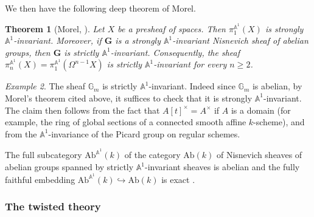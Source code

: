 \documentclass[11pt,leqno]{amsart}
\renewcommand{\1}{{\rm 1\hspace*{-0.4ex}%
\rule{0.1ex}{1.52ex}\hspace*{0.2ex}}}
\newcommand{\Ab}{\mathrm{Ab}}
\newcommand{\<}[1]{{\langle}#1 {\rangle}}
\newcommand{\Abb}{\mathbb{A}}
\newcommand{\Gbf}{\mathbf{G}}
\theoremstyle{plain}
\newtheorem{thm}{Theorem}[section]
\theoremstyle{definition}
\theoremstyle{remark}
\newtheorem{ex}[thm]{Example}
\numberwithin{equation}{section}
\begin{document}
We then have the following deep theorem of Morel.

\begin{thm}[Morel, ]\label{theo:strictly_invariant}
Let $X$ be a presheaf of spaces. Then $\pi_1^{\Abb^1}(X)$ is strongly $\Abb^1$-invariant. Moreover, if $\Gbf$ is a strongly $\Abb^1$-invariant Nisnevich sheaf of abelian groups, then $\Gbf$ is strictly $\Abb^1$-invariant. Consequently, the sheaf $\pi_n^{\Abb^1}(X)=\pi_1^{\Abb^1}(\Omega^{n-1}X)$ is strictly $\Abb^1$-invariant for every $n\geq 2$.
\end{thm}

\begin{ex}
The sheaf $\mathbb{G}_m$ is strictly $\Abb^1$-invariant. Indeed since $\mathbb{G}_m$ is abelian, by Morel's theorem cited above, it suffices to check that it is strongly $\Abb^1$-invariant. The claim then follows from the fact that $A[t]^\times=A^\times$ if $A$ is a domain (for example, the ring of global sections of a connected smooth affine $k$-scheme), and from the $\Abb^1$-invariance of the Picard group on regular schemes.
\end{ex}

The full subcategory $\Ab^{\Abb^1}(k)$ of the category $\Ab(k)$ of Nisnevich sheaves of abelian groups spanned by strictly $\Abb^1$-invariant sheaves is abelian and the fully faithful embedding $\Ab^{\Abb^1}(k)\hookrightarrow\Ab(k)$ is exact \cite[Corollary 6.24]{morelA1AlgebraicTopologyField2012}.

\subsubsection*{The twisted theory}
\end{document}
